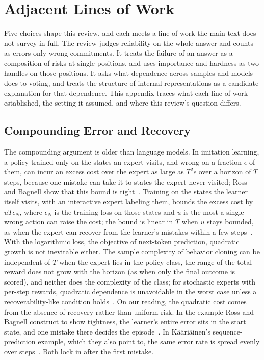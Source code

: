 \documentclass{ieeeaccess}
\begin{document}
\section{Adjacent Lines of Work}
\label{app:adjacent}
Five choices shape this review, and each meets a line of work the main text does not survey in full. The review judges reliability on the whole answer and counts as errors only wrong commitments. It treats the failure of an answer as a composition of risks at single positions, and uses importance and hardness as two handles on those positions. It asks what dependence across samples and models does to voting, and treats the structure of internal representations as a candidate explanation for that dependence. This appendix traces what each line of work established, the setting it assumed, and where this review's question differs.

\subsection{Compounding Error and Recovery}
The compounding argument is older than language models. In imitation learning, a policy trained only on the states an expert visits, and wrong on a fraction $\epsilon$ of them, can incur an excess cost over the expert as large as $T^2\epsilon$ over a horizon of $T$ steps, because one mistake can take it to states the expert never visited; Ross and Bagnell show that this bound is tight~\cite{ross2010efficient}. Training on the states the learner itself visits, with an interactive expert labeling them, bounds the excess cost by $uT\epsilon_N$, where $\epsilon_N$ is the training loss on those states and $u$ is the most a single wrong action can raise the cost; the bound is linear in $T$ when $u$ stays bounded, as when the expert can recover from the learner's mistakes within a few steps~\cite{ross2011dagger}. With the logarithmic loss, the objective of next-token prediction, quadratic growth is not inevitable either. The sample complexity of behavior cloning can be independent of $T$ when the expert lies in the policy class, the range of the total reward does not grow with the horizon (as when only the final outcome is scored), and neither does the complexity of the class; for stochastic experts with per-step rewards, quadratic dependence is unavoidable in the worst case unless a recoverability-like condition holds~\cite{foster2024behavior}. On our reading, the quadratic cost comes from the absence of recovery rather than uniform risk. In the example Ross and Bagnell construct to show tightness, the learner's entire error sits in the start state, and one mistake there decides the episode~\cite{ross2010efficient}. In K\"a\"ari\"ainen's sequence-prediction example, which they also point to, the same error rate is spread evenly over steps~\cite{ross2011dagger}. Both lock in after the first mistake.
\end{document}
